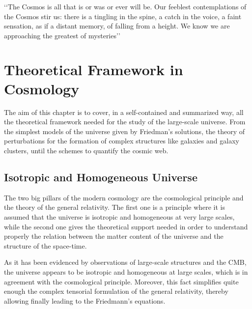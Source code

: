 \begin{savequote}[50mm]
‘‘The Cosmos is all that is or was or ever will be. Our feeblest contemplations 
of the Cosmos stir us: there is a tingling in the spine, a catch in the voice, 
a faint sensation, as if a distant memory, of falling from a height. We know 
we are approaching the greatest of mysteries’’

\end{savequote}




\chapter{Theoretical Framework in Cosmology}
\label{cha:Theoretical Framework}


The aim of this chapter is to cover, in a self-contained and summarized 
way, all the theoretical framework needed for the study of the large-scale
universe. From the simplest models of the universe given by Friedman's 
solutions, the theory of perturbations for the formation of complex 
structures like galaxies and galaxy clusters, until the schemes to 
quantify the cosmic web.







\section{Isotropic and Homogeneous Universe}
\label{sec:IsotropicAndHomogeneousUniverse}


The two big pillars of the modern cosmology are the cosmological principle
and the theory of the general relativity. The first one is a principle 
where it is assumed that the universe is isotropic and homogeneous at very
large scales, while the second one gives the theoretical support needed in 
order to understand properly the relation between the matter content of 
the universe and the structure of the space-time.


As it has been evidenced by observations of large-scale structures and the 
CMB, the universe appears to be isotropic and homogeneous at large scales,
which is in agreement with the cosmological principle. Moreover, this fact
simplifies quite enough the complex tensorial formulation of the general
relativity, thereby allowing finally leading to the Friedmann's equations.



